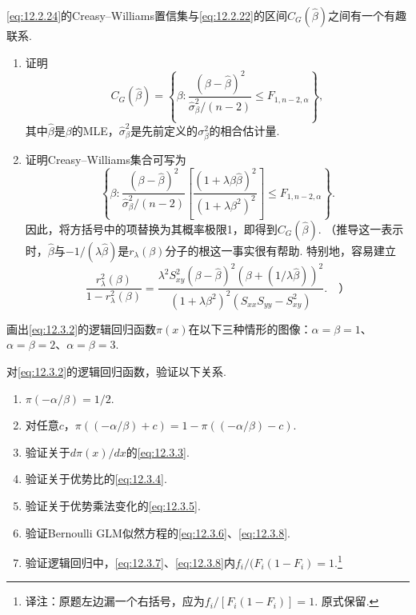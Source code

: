 \begin{exercise}\label{exercise:12.13}
\eqref{eq:12.2.24}的Creasy--Williams置信集与\eqref{eq:12.2.22}的区间$C_G(\hat\beta)$之间有一个有趣联系.
\begin{enumerate}[label=(\alph*)]
\item\label{item:12.13.a} 证明
$$C_G(\hat\beta)=\left\{\beta:\frac{(\beta-\hat\beta)^2}{\hat\sigma_\beta^2/(n-2)}\le F_{1,n-2,\alpha}\right\},$$
其中$\hat\beta$是$\beta$的MLE，$\hat\sigma_\beta^2$是先前定义的$\sigma_\beta^2$的相合估计量.
\item\label{item:12.13.b} 证明Creasy--Williams集合可写为
$$\left\{\beta:\frac{(\beta-\hat\beta)^2}{\hat\sigma_\beta^2/(n-2)}
\left[\frac{(1+\lambda\beta\hat\beta)^2}{(1+\lambda\beta^2)^2}\right]\le F_{1,n-2,\alpha}\right\}.$$
因此，将方括号中的项替换为其概率极限1，即得到$C_G(\hat\beta)$. （推导这一表示时，$\hat\beta$与$-1/(\lambda\hat\beta)$是$r_\lambda(\beta)$分子的根这一事实很有帮助. 特别地，容易建立
$$\frac{r_\lambda^2(\beta)}{1-r_\lambda^2(\beta)}
=\frac{\lambda^2S_{xy}^2(\beta-\hat\beta)^2(\beta+(1/\lambda\hat\beta))^2}
{(1+\lambda\beta^2)^2(S_{xx}S_{yy}-S_{xy}^2)}.\quad\text{）}$$
\end{enumerate}
\end{exercise}

\begin{exercise}\label{exercise:12.14}
画出\eqref{eq:12.3.2}的逻辑回归函数$\pi(x)$在以下三种情形的图像：$\alpha=\beta=1$、$\alpha=\beta=2$、$\alpha=\beta=3$.
\end{exercise}

\begin{exercise}\label{exercise:12.15}
对\eqref{eq:12.3.2}的逻辑回归函数，验证以下关系.
\begin{enumerate}[label=(\alph*)]
\item\label{item:12.15.a} $\pi(-\alpha/\beta)=1/2$.
\item\label{item:12.15.b} 对任意$c$，$\pi((-\alpha/\beta)+c)=1-\pi((-\alpha/\beta)-c)$.
\item\label{item:12.15.c} 验证关于$d\pi(x)/dx$的\eqref{eq:12.3.3}.
\item\label{item:12.15.d} 验证关于优势比的\eqref{eq:12.3.4}.
\item\label{item:12.15.e} 验证关于优势乘法变化的\eqref{eq:12.3.5}.
\item\label{item:12.15.f} 验证Bernoulli GLM似然方程的\eqref{eq:12.3.6}、\eqref{eq:12.3.8}.
\item\label{item:12.15.g} 验证逻辑回归中，\eqref{eq:12.3.7}、\eqref{eq:12.3.8}内$f_i/(F_i(1-F_i)=1$.\footnote{译注：原题左边漏一个右括号，应为$f_i/[F_i(1-F_i)]=1$. 原式保留.}
\end{enumerate}
\end{exercise}

